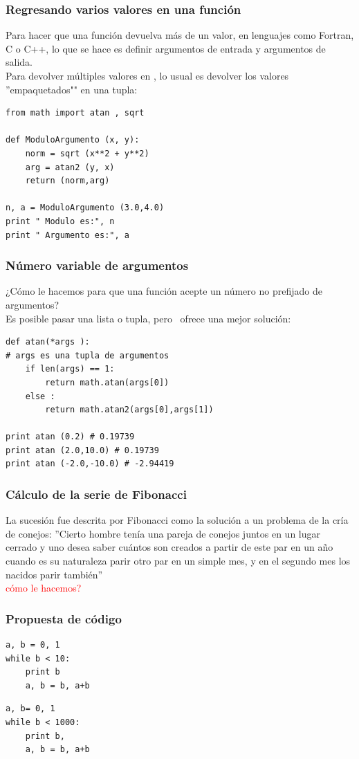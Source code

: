 \begin{frame}[fragile]
\frametitle{Regresando varios valores en una función}
Para hacer que una función devuelva más de un valor, en lenguajes como Fortran, C o C++, lo que se hace es definir argumentos de entrada y argumentos de salida.
\\
\medskip
Para devolver múltiples valores en \python, lo usual es devolver los valores ''empaquetados"" en una tupla:
\begin{verbatim}
from math import atan , sqrt

def ModuloArgumento (x, y):
    norm = sqrt (x**2 + y**2)
    arg = atan2 (y, x)
    return (norm,arg)
    
n, a = ModuloArgumento (3.0,4.0)
print " Modulo es:", n
print " Argumento es:", a
\end{verbatim}
\end{frame}
\begin{frame}[fragile]
\frametitle{Número variable de argumentos}
¿Cómo le hacemos para que una función acepte un número no prefijado de argumentos?
\\
\medskip
Es posible pasar una lista o tupla, pero \python\ ofrece una mejor solución:
\begin{verbatim}
def atan(*args ):
# args es una tupla de argumentos
    if len(args) == 1:
        return math.atan(args[0])
    else :
        return math.atan2(args[0],args[1])

print atan (0.2) # 0.19739
print atan (2.0,10.0) # 0.19739
print atan (-2.0,-10.0) # -2.94419
\end{verbatim}
\end{frame}
\begin{frame}
\frametitle{Cálculo de la serie de Fibonacci}
La sucesión fue descrita por Fibonacci como la solución a un problema de la cría de conejos: ''Cierto hombre tenía una pareja de conejos juntos en un lugar cerrado y uno desea saber cuántos son creados a partir de este par en un año cuando es su naturaleza parir otro par en un simple mes, y en el segundo mes los nacidos parir también''
\\
\bigskip
\pause
\textcolor{red}{cómo le hacemos?}
\end{frame}
\begin{frame}[fragile]
\frametitle{Propuesta de código}
\begin{lstlisting}
a, b = 0, 1
while b < 10:
    print b
    a, b = b, a+b
\end{lstlisting}
\pause
\begin{lstlisting}
a, b= 0, 1
while b < 1000:
    print b,
    a, b = b, a+b
\end{lstlisting}
\end{frame}
